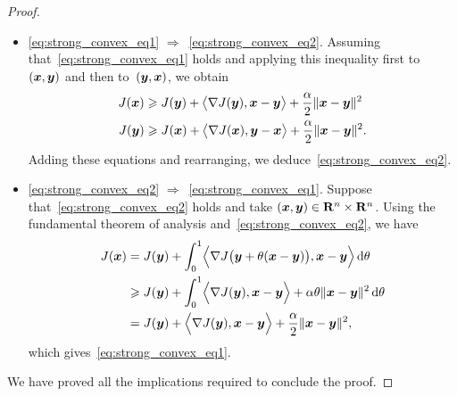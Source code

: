 \begin{proof}
\begin{itemize}
    \item
        \eqref{eq:strong_convex_eq1} $\Rightarrow$~\eqref{eq:strong_convex_eq2}.
        Assuming that~\eqref{eq:strong_convex_eq1} holds and applying this inequality first to~$(\vect x, \vect y)$ and then to~$(\vect y, \vect x)$,
        we obtain
        \begin{align*}
            J(\vect x) &\geq J(\vect y) + \ip[\big]{\nabla J(\vect y), \vect x - \vect y} + \frac{\alpha}{2} \norm{\vect x - \vect y}^2 \\
            J(\vect y) &\geq J(\vect x) + \ip[\big]{\nabla J(\vect x), \vect y - \vect x} + \frac{\alpha}{2} \norm{\vect x - \vect y}^2.
        \end{align*}
        Adding these equations and rearranging,
        we deduce~\eqref{eq:strong_convex_eq2}.

    \item
        \eqref{eq:strong_convex_eq2} $\Rightarrow$~\eqref{eq:strong_convex_eq1}.
        Suppose that~\eqref{eq:strong_convex_eq2} holds and
        take $(\vect x, \vect y) \in \real^n \times \real^n$.
        Using the fundamental theorem of analysis and~\eqref{eq:strong_convex_eq2},
        we have
        \begin{align*}
            J(\vect x)
            &=  J(\vect y) + \int_{0}^{1} \ip[\Big]{\nabla J\bigl(\vect y + \theta (\vect x - \vect y) \bigr), \vect x - \vect y} \, \d \theta \\
            &\geq J(\vect y) + \int_{0}^{1} \ip[\Big]{\nabla J(\vect y), \vect x - \vect y} + \alpha \theta \norm{\vect x - \vect y}^2 \, \d \theta \\
            &= J(\vect y) + \ip[\Big]{\nabla J(\vect y), \vect x - \vect y} + \frac{\alpha}{2} \norm{\vect x - \vect y}^2,
        \end{align*}
        which gives~\eqref{eq:strong_convex_eq1}.
    \end{itemize}
    We have proved all the implications required to conclude the proof.
\end{proof}

